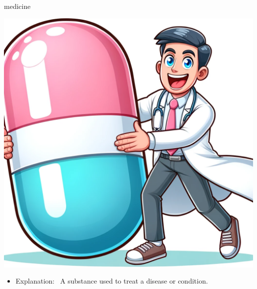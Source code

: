 \documentclass[avery5371, grid,frame]{flashcards}
\begin{document}
\renewcommand{\cardpaper}{a4paper}
\renewcommand{\cardpapermode}{landscape}
\renewcommand{\cardrows}{2}
\renewcommand{\cardcolumns}{2}
\setlength{\cardheight}{3.5in}
\setlength{\cardwidth}{5.0in}
\setlength{\topoffset}{0.50in}
\setlength{\oddoffset}{0.50in}
\setlength{\evenoffset}{0.50in}

\begin{flashcard}{medicine}
    \vspace*{\fill}
    \begin{center}
        \begin{minipage}[c]{.45\textwidth}
            \includegraphics[width=\textwidth]{cards/m/medicine/medicine - a doctor holding a giant pill, ready to administer it.png}
        \end{minipage}
        \begin{minipage}[c]{.45\textwidth}
            \begin{itemize}\setlength\itemsep{12pt}
            \item Explanation: \ A substance used to treat a disease or condition.


\end{itemize}
\end{minipage}
\end{center}
\end{flashcard}
\end{document}

